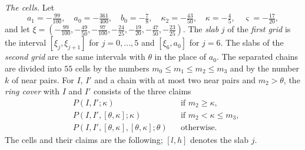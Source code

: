 \documentclass[reqno,a4paper,11pt]{amsart}
\numberwithin{equation}{section}
\begin{document}
\emph{The cells.} Let
$$
a_1 = -\tfrac{99}{100}, \quad a_0 = -\tfrac{361}{400}, \quad b_0 = -\tfrac78, \quad \kappa_2 = -\tfrac{43}{50}, \quad \kappa = -\tfrac45, \quad \varsigma = -\tfrac{17}{20},
$$
and let $\xi = (-\tfrac{99}{100}, -\tfrac{49}{50}, -\tfrac{97}{100}, -\tfrac{24}{25}, -\tfrac{19}{20}, -\tfrac{47}{50}, -\tfrac{23}{25})$. The \emph{slab} $j$ of the \emph{first grid} is the interval $[\xi_j, \xi_{j+1}]$ for $j = 0, \dots, 5$ and $[\xi_6, a_0]$ for $j = 6$. The slabs of the \emph{second grid} are the same intervals with $\theta$ in the place of $a_0$. The separated chains are divided into $55$ cells by the numbers $m_0 \leq m_1 \leq m_2 \leq m_3$ and by the number $k$ of near pairs. For $I$, $I'$ and a chain with at most two near pairs and $m_2 > \theta$, the \emph{ring cover} with $I$ and $I'$ consists of the three claims
\begin{align*}
& P(I, I'; \kappa) && \text{if } m_2 \geq \kappa, \\
& P(I, I', [\theta, \kappa]; \kappa) && \text{if } m_2 < \kappa \leq m_3, \\
& P(I, I', [\theta, \kappa], [\theta, \kappa]; \theta) && \text{otherwise.}
\end{align*}
The cells and their claims are the following; $[l, h]$ denotes the slab $j$.
\end{document}
